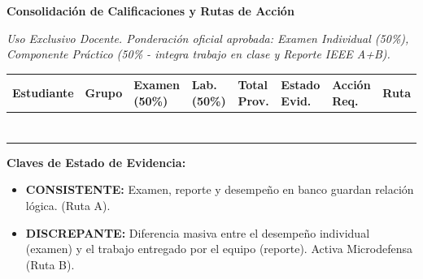 \documentclass[11pt, a4paper]{article}
\begin{document}
\begin{tcolorbox}[colback=ucbblue!5!white, colframe=ucbblue, title=\textbf{Matriz de Reconciliación de Evidencias (EC2)}]
    \centering \textbf{Consolidación de Calificaciones y Rutas de Acción}
\end{tcolorbox}

\noindent \textit{Uso Exclusivo Docente. Ponderación oficial aprobada: Examen Individual (50\%), Componente Práctico (50\% - integra trabajo en clase y Reporte IEEE A+B).}

\vspace{0.3cm}
\renewcommand{\arraystretch}{2} %
\noindent
\begin{tabularx}{\textwidth}{
  >{\RaggedRight\arraybackslash\hsize=2.0\hsize}X 
  >{\centering\arraybackslash\hsize=0.6\hsize}X 
  >{\centering\arraybackslash\hsize=0.8\hsize}X 
  >{\centering\arraybackslash\hsize=0.8\hsize}X 
  >{\centering\arraybackslash\hsize=0.7\hsize}X 
  >{\centering\arraybackslash\hsize=0.9\hsize}X 
  >{\RaggedRight\arraybackslash\hsize=1.5\hsize}X 
  >{\centering\arraybackslash\hsize=0.7\hsize}X}
\toprule
\textbf{Estudiante} & \textbf{Grupo} & \textbf{Examen (50\%)} & \textbf{Lab. (50\%)} & \textbf{Total Prov.} & \textbf{Estado Evid.} & \textbf{Acción Req.} & \textbf{Ruta} \\ 
\midrule
 & & & & & & & \\ \midrule
 & & & & & & & \\ \midrule
 & & & & & & & \\ \midrule
 & & & & & & & \\ \midrule
 & & & & & & & \\ \midrule
 & & & & & & & \\ \midrule
 & & & & & & & \\ 
\bottomrule
\end{tabularx}

\vspace{0.5cm}
\textbf{Claves de Estado de Evidencia:}
\begin{itemize}
    \item \textbf{CONSISTENTE:} Examen, reporte y desempeño en banco guardan relación lógica. (Ruta A).
    \item \textbf{DISCREPANTE:} Diferencia masiva entre el desempeño individual (examen) y el trabajo entregado por el equipo (reporte). Activa Microdefensa (Ruta B).
\end{itemize}
\end{document}
